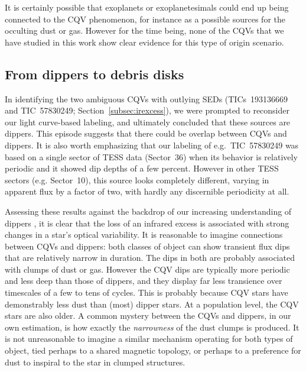 \documentclass[11pt,twocolumn,tighten]{aastex63}
\begin{document}
It is certainly possible that exoplanets or exoplanetesimals could end
up being connected to the CQV phenomenon, for instance as a possible
sources for the occulting dust or gas.  However for the time being,
none of the CQVs that we have studied in this work show clear evidence
for this type of origin scenario.


\subsection{From dippers to debris disks}
\label{subsec:discdippers}

In identifying the two ambiguous CQVs with outlying SEDs
(TICs~193136669 and TIC~57830249; Section~\ref{subsec:irexcess}), we
were prompted to reconsider our light curve-based labeling, and
ultimately concluded that these sources are dippers.  This episode
suggests that there could be overlap between CQVs and dippers.  It is
also worth emphasizing that our labeling of e.g.~TIC~57830249 was
based on a single sector of TESS data (Sector~36) when its behavior is
relatively periodic and it showed dip depths of a few percent.
However in other TESS sectors (e.g. Sector~10), this source looks
completely different, varying in apparent flux by a factor of two,
with hardly any discernible periodicity at all.

Assessing these results against the backdrop of our increasing
understanding of dippers
\citep[e.g.][]{2014AJ....147...82C,2016ApJ...816...69A,2021ApJ...908...16R,2022ApJS..263...14C},
it is clear that the loss of an infrared excess is associated with
strong changes in a star's optical variability.  It is reasonable to
imagine connections between CQVs and dippers: both classes of object
can show transient flux dips that are relatively narrow in duration.
The dips in both are probably associated with clumps of dust or gas.
However the CQV dips are typically more periodic and less deep than
those of dippers, and they display far less transience over timescales
of a few to tens of cycles.  This is probably because CQV stars have
demonstrably less dust than (most) dipper stars.  At a population
level, the CQV stars are also older.  A common mystery between the
CQVs and dippers, in our own estimation, is how exactly the {\it
narrowness} of the dust clumps is produced.  It is not unreasonable to
imagine a similar mechanism operating for both types of object, tied
perhaps to a shared magnetic topology, or perhaps to a preference for
dust to inspiral to the star in clumped structures.
\end{document}
